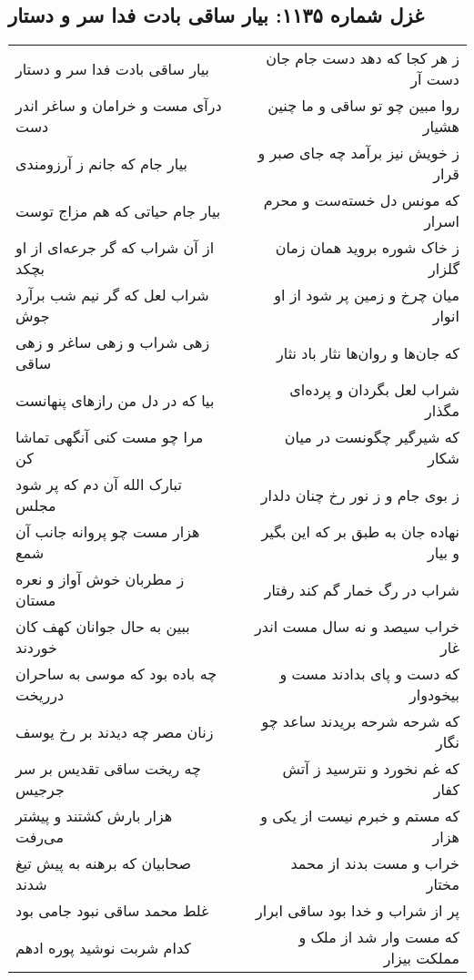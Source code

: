 \begin{center}
\section*{غزل شماره ۱۱۳۵: بیار ساقی بادت فدا سر و دستار}
\label{sec:1135}
\begin{longtable}{l p{0.5cm} r}
بیار ساقی بادت فدا سر و دستار
&&
ز هر کجا که دهد دست جام جان دست آر
\\
درآی مست و خرامان و ساغر اندر دست
&&
روا مبین چو تو ساقی و ما چنین هشیار
\\
بیار جام که جانم ز آرزومندی
&&
ز خویش نیز برآمد چه جای صبر و قرار
\\
بیار جام حیاتی که هم مزاج توست
&&
که مونس دل خسته‌ست و محرم اسرار
\\
از آن شراب که گر جرعه‌ای از او بچکد
&&
ز خاک شوره بروید همان زمان گلزار
\\
شراب لعل که گر نیم شب برآرد جوش
&&
میان چرخ و زمین پر شود از او انوار
\\
زهی شراب و زهی ساغر و زهی ساقی
&&
که جان‌ها و روان‌ها نثار باد نثار
\\
بیا که در دل من رازهای پنهانست
&&
شراب لعل بگردان و پرده‌ای مگذار
\\
مرا چو مست کنی آنگهی تماشا کن
&&
که شیرگیر چگونست در میان شکار
\\
تبارک الله آن دم که پر شود مجلس
&&
ز بوی جام و ز نور رخ چنان دلدار
\\
هزار مست چو پروانه جانب آن شمع
&&
نهاده جان به طبق بر که این بگیر و بیار
\\
ز مطربان خوش آواز و نعره مستان
&&
شراب در رگ خمار گم کند رفتار
\\
ببین به حال جوانان کهف کان خوردند
&&
خراب سیصد و نه سال مست اندر غار
\\
چه باده بود که موسی به ساحران درریخت
&&
که دست و پای بدادند مست و بیخودوار
\\
زنان مصر چه دیدند بر رخ یوسف
&&
که شرحه شرحه بریدند ساعد چو نگار
\\
چه ریخت ساقی تقدیس بر سر جرجیس
&&
که غم نخورد و نترسید ز آتش کفار
\\
هزار بارش کشتند و پیشتر می‌رفت
&&
که مستم و خبرم نیست از یکی و هزار
\\
صحابیان که برهنه به پیش تیغ شدند
&&
خراب و مست بدند از محمد مختار
\\
غلط محمد ساقی نبود جامی بود
&&
پر از شراب و خدا بود ساقی ابرار
\\
کدام شربت نوشید پوره ادهم
&&
که مست وار شد از ملک و مملکت بیزار
\\

\end{longtable}
\end{center}
